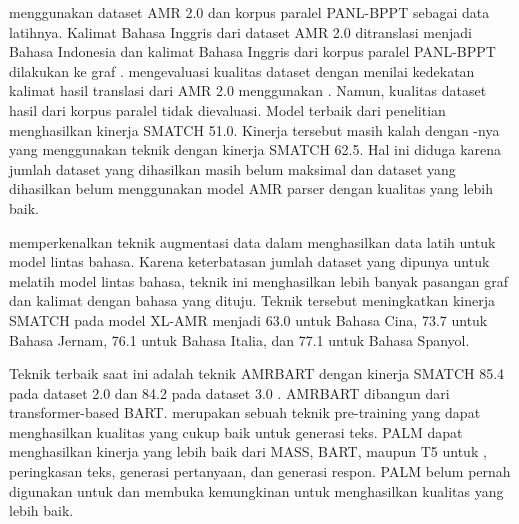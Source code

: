 \textcite{putra2022} menggunakan dataset AMR 2.0 dan korpus paralel PANL-BPPT sebagai data latihnya.
Kalimat Bahasa Inggris dari dataset AMR 2.0 ditranslasi menjadi Bahasa Indonesia dan kalimat Bahasa Inggris dari korpus paralel PANL-BPPT dilakukan  ke graf \AMR{}.
\textcite{putra2022} mengevaluasi kualitas dataset dengan menilai kedekatan kalimat hasil translasi dari AMR 2.0 menggunakan \cossim{}.
Namun, kualitas dataset hasil \amrparsing{} dari korpus paralel tidak dievaluasi.
Model terbaik dari penelitian \textcite{putra2022} menghasilkan kinerja SMATCH 51.0.
Kinerja tersebut masih kalah dengan -nya yang menggunakan teknik  dengan kinerja SMATCH 62.5.
Hal ini diduga karena jumlah dataset yang dihasilkan masih belum maksimal dan dataset yang dihasilkan belum menggunakan model AMR parser dengan kualitas yang lebih baik.

\textcite{lee2022} memperkenalkan teknik augmentasi data dalam menghasilkan data latih untuk model \amrparsing{} lintas bahasa.
Karena keterbatasan jumlah dataset yang dipunya untuk melatih model \amrparsing{} lintas bahasa, teknik ini menghasilkan lebih banyak pasangan graf \AMR{} dan kalimat dengan bahasa yang dituju.
Teknik tersebut meningkatkan kinerja SMATCH pada model XL-AMR  menjadi 63.0 untuk Bahasa Cina, 73.7 untuk Bahasa Jernam, 76.1 untuk Bahasa Italia, dan 77.1 untuk Bahasa Spanyol.

Teknik \amrparsing{} terbaik saat ini adalah teknik \gls{AMRBART} dengan kinerja SMATCH 85.4 pada dataset \AMR{} 2.0 dan 84.2 pada dataset \AMR{} 3.0 .
\gls{AMRBART} dibangun dari transformer-based  \gls{BART}.
 merupakan sebuah teknik pre-training yang dapat menghasilkan kualitas  yang cukup baik untuk  generasi teks.
\gls{PALM} dapat menghasilkan kinerja yang lebih baik dari \gls{MASS}, \gls{BART}, maupun T5 untuk  , peringkasan teks, generasi pertanyaan, dan generasi respon.
\gls{PALM} belum pernah digunakan untuk  \amrparsing{} dan membuka kemungkinan untuk menghasilkan kualitas yang lebih baik.
